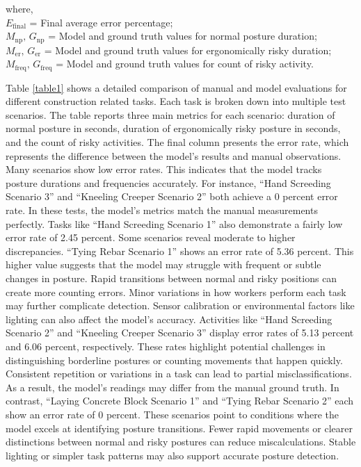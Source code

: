 \documentclass[11pt]{article}
\begin{document}
\noindent where,\\
$E_{\mathrm{final}}$  = Final average error percentage;\\
$M_{\mathrm{np}},\, G_{\mathrm{np}}$  = Model and ground truth values for normal posture duration;\\
$M_{\mathrm{er}},\, G_{\mathrm{er}}$ = Model and ground truth values for ergonomically risky duration;\\
$M_{\mathrm{freq}},\, G_{\mathrm{freq}} $ = Model and ground truth values for count of risky activity.



Table \ref{table1} shows a detailed comparison of manual and model evaluations for different construction related tasks. Each task is broken down into multiple test scenarios. The table reports three main metrics for each scenario: duration of normal posture in seconds, duration of ergonomically risky posture in seconds, and the count of risky activities. The final column presents the error rate, which represents the difference between the model's results and manual observations. Many scenarios show low error rates. This indicates that the model tracks posture durations and frequencies accurately. For instance, “Hand Screeding Scenario 3” and “Kneeling Creeper Scenario 2” both achieve a 0 percent error rate. In these tests, the model’s metrics match the manual measurements perfectly. Tasks like “Hand Screeding Scenario 1” also demonstrate a fairly low error rate of 2.45 percent. Some scenarios reveal moderate to higher discrepancies. “Tying Rebar Scenario 1” shows an error rate of 5.36 percent. This higher value suggests that the model may struggle with frequent or subtle changes in posture. Rapid transitions between normal and risky positions can create more counting errors. Minor variations in how workers perform each task may further complicate detection. Sensor calibration or environmental factors like lighting can also affect the model's accuracy. Activities like “Hand Screeding Scenario 2” and “Kneeling Creeper Scenario 3” display error rates of 5.13 percent and 6.06 percent, respectively. These rates highlight potential challenges in distinguishing borderline postures or counting movements that happen quickly. Consistent repetition or variations in a task can lead to partial misclassifications. As a result, the model's readings may differ from the manual ground truth. In contrast, “Laying Concrete Block Scenario 1” and “Tying Rebar Scenario 2” each show an error rate of 0 percent. These scenarios point to conditions where the model excels at identifying posture transitions. Fewer rapid movements or clearer distinctions between normal and risky postures can reduce miscalculations. Stable lighting or simpler task patterns may also support accurate posture detection. 
\end{document}
